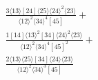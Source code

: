 \documentclass[varwidth, border=5pt]{standalone}
\begin{document}
\begin{my}
$\begin{gathered}
\scriptscriptstyle\frac{3⟨13⟩[24]⟨25⟩⟨24⟩^2⟨23⟩}{⟨12⟩^2⟨34⟩^4[45]}+\\
\scriptscriptstyle\frac{1[14]⟨13⟩^2[34]⟨24⟩^2⟨23⟩}{⟨12⟩^2⟨34⟩^4[45]^2}+\\
\scriptscriptstyle\frac{2⟨13⟩⟨25⟩[34]⟨24⟩⟨23⟩}{⟨12⟩^2⟨34⟩^3[45]}\phantom{+}
\end{gathered}$
\end{my}
\end{document}

